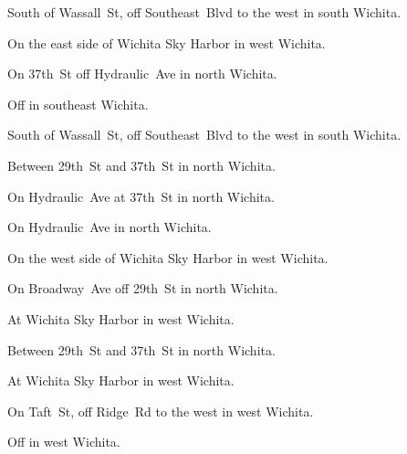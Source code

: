 

\begin{LocationList}

South of Wassall~St, off  Southeast~Blvd to the west in south Wichita.

On the east side of Wichita Sky Harbor in west Wichita.

On 37th~St off Hydraulic~Ave in north Wichita.

Off   in southeast Wichita.

South of Wassall~St, off  Southeast~Blvd to the west in south Wichita.

Between 29th~St and 37th~St in north Wichita.

\Location{\GarageHQ \Garage}
On Hydraulic~Ave at 37th~St in north Wichita.

\Location{\GasStation \Gas}
On Hydraulic~Ave in north Wichita.

On the west side of Wichita Sky Harbor in west Wichita.

On Broadway~Ave off 29th~St in north Wichita.

\Location{\RecruitmentAgency \Recruitment}
At Wichita Sky Harbor in west Wichita.

Between 29th~St and 37th~St in north Wichita.

At Wichita Sky Harbor in west Wichita.

On Taft~St, off Ridge~Rd to the west in west Wichita.

Off   in west Wichita.

\end{LocationList}
